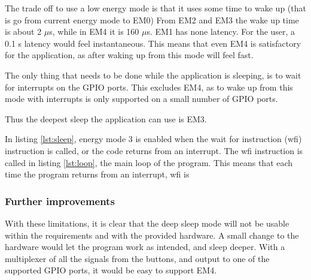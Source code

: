 The trade off to use a low energy mode is that it uses some time to wake up (that is go from current energy mode to EM0)
From EM2 and EM3  the wake up time is about 2 $\mu$s, while in EM4 it is 160 $\mu$s.
EM1 has none latency.
For the user, a 0.1 s latency would feel instantaneous.\cite{response}
This means that even EM4 is satisfactory for the application, as after waking up from this mode will feel fast.

The only thing that needs to be done while the application is sleeping, is to wait for interrupts on the GPIO ports.
This excludes EM4, as to wake up from this mode with interrupts is only supported on a small number of GPIO ports.

Thus the deepest sleep the application can use is EM3.



In listing \ref{lst:sleep}, energy mode 3 is enabled when the wait for instruction (wfi) instruction is called, or the code returns from an interrupt.
The wfi instruction is called in listing \ref{lst:loop}, the main loop of the program. 
This means that each time the program returns from an interrupt, wfi is 


\subsubsection{Further improvements}

With these limitations, it is clear that the deep sleep mode will not be usable within the requirements and with the provided hardware.
A small change to the hardware would let the program work as intended, and sleep deeper.
With a multiplexer of all the signals from the buttons, and output to one of the supported GPIO ports, it would be easy to support EM4.
